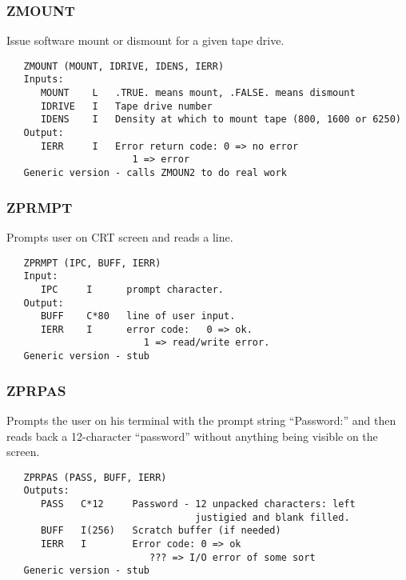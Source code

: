\subsubsection{ZMOUNT}
Issue software mount or dismount for a given tape drive.
\begin{verbatim}
   ZMOUNT (MOUNT, IDRIVE, IDENS, IERR)
   Inputs:
      MOUNT    L   .TRUE. means mount, .FALSE. means dismount
      IDRIVE   I   Tape drive number
      IDENS    I   Density at which to mount tape (800, 1600 or 6250)
   Output:
      IERR     I   Error return code: 0 => no error
                      1 => error
   Generic version - calls ZMOUN2 to do real work
\end{verbatim}

\subsubsection{ZPRMPT}
Prompts user on CRT screen and reads a line.
\begin{verbatim}
   ZPRMPT (IPC, BUFF, IERR)
   Input:
      IPC     I      prompt character.
   Output:
      BUFF    C*80   line of user input.
      IERR    I      error code:   0 => ok.
                        1 => read/write error.
   Generic version - stub
\end{verbatim}

\subsubsection{ZPRPAS}
Prompts the user on his terminal with the prompt string
``Password:'' and then reads back a 12-character ``password'' without
anything being visible on the screen.
\begin{verbatim}
   ZPRPAS (PASS, BUFF, IERR)
   Outputs:
      PASS   C*12     Password - 12 unpacked characters: left
                                 justigied and blank filled.
      BUFF   I(256)   Scratch buffer (if needed)
      IERR   I        Error code: 0 => ok
                         ??? => I/O error of some sort
   Generic version - stub
\end{verbatim}


